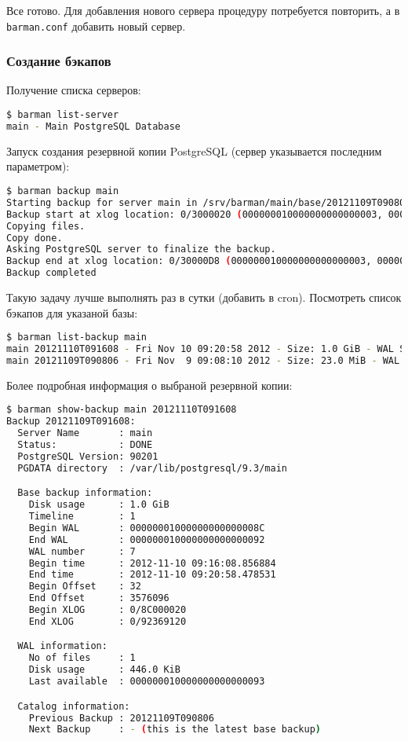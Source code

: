 Все готово. Для добавления нового сервера процедуру потребуется повторить, а в \lstinline!barman.conf! добавить новый сервер.


\subsubsection{Создание бэкапов}

Получение списка серверов:

\begin{lstlisting}[language=Bash,label=lst:barman12,caption=Список серверов]
$ barman list-server
main - Main PostgreSQL Database
\end{lstlisting}

Запуск создания резервной копии PostgreSQL (сервер указывается последним параметром):

\begin{lstlisting}[language=Bash,label=lst:barman13,caption=Создание бэкапа]
$ barman backup main
Starting backup for server main in /srv/barman/main/base/20121109T090806
Backup start at xlog location: 0/3000020 (000000010000000000000003, 00000020)
Copying files.
Copy done.
Asking PostgreSQL server to finalize the backup.
Backup end at xlog location: 0/30000D8 (000000010000000000000003, 000000D8)
Backup completed
\end{lstlisting}

Такую задачу лучше выполнять раз в сутки (добавить в cron). Посмотреть список бэкапов для указаной базы:

\begin{lstlisting}[language=Bash,label=lst:barman14,caption=Список бэкапов]
$ barman list-backup main
main 20121110T091608 - Fri Nov 10 09:20:58 2012 - Size: 1.0 GiB - WAL Size: 446.0 KiB
main 20121109T090806 - Fri Nov  9 09:08:10 2012 - Size: 23.0 MiB - WAL Size: 477.0 MiB
\end{lstlisting}

Более подробная информация о выбраной резервной копии:

\begin{lstlisting}[language=Bash,label=lst:barman15,caption=Информация о выбраной резервной копии]
$ barman show-backup main 20121110T091608
Backup 20121109T091608:
  Server Name       : main
  Status:           : DONE
  PostgreSQL Version: 90201
  PGDATA directory  : /var/lib/postgresql/9.3/main

  Base backup information:
    Disk usage      : 1.0 GiB
    Timeline        : 1
    Begin WAL       : 00000001000000000000008C
    End WAL         : 000000010000000000000092
    WAL number      : 7
    Begin time      : 2012-11-10 09:16:08.856884
    End time        : 2012-11-10 09:20:58.478531
    Begin Offset    : 32
    End Offset      : 3576096
    Begin XLOG      : 0/8C000020
    End XLOG        : 0/92369120

  WAL information:
    No of files     : 1
    Disk usage      : 446.0 KiB
    Last available  : 000000010000000000000093

  Catalog information:
    Previous Backup : 20121109T090806
    Next Backup     : - (this is the latest base backup)
\end{lstlisting}

